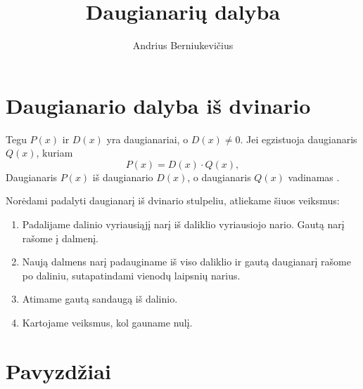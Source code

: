 \documentclass[11pt,a4paper]{scrartcl}
\title{Daugianarių dalyba}
\author{Andrius Berniukevičius}
\begin{document}
\maketitle

\section{Daugianario dalyba iš dvinario}

\begin{definition}
Tegu $P(x)$ ir $D(x)$ yra daugianariai, o $D(x) \ne 0$. Jei egzistuoja daugianaris $Q(x)$, kuriam
\[
P(x)=D(x)\cdot Q(x),
\]
Daugianaris $P(x)$  iš daugianario $D(x)$, o daugianaris $Q(x)$ vadinamas .
\end{definition}

\begin{algorithm}
Norėdami padalyti daugianarį iš dvinario stulpeliu, atliekame šiuos veiksmus:
\begin{enumerate}
    \item Padalijame dalinio vyriausiąjį narį iš daliklio vyriausiojo nario. Gautą narį rašome į dalmenį.
    \item Naują dalmens narį padauginame iš viso daliklio ir gautą daugianarį rašome po daliniu, sutapatindami vienodų laipsnių narius.
    \item Atimame gautą sandaugą iš dalinio.
	\item Kartojame veiksmus, kol gauname nulį.
\end{enumerate}
\end{algorithm}

\section{Pavyzdžiai}
\end{document}
